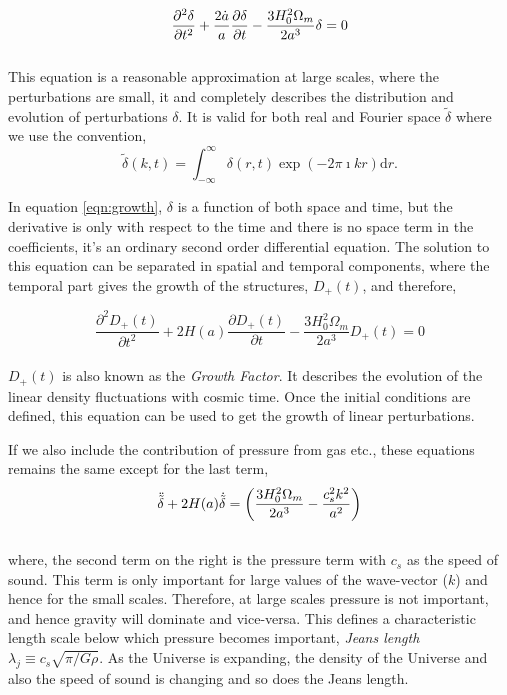 \begin{equation}
\centering
\dfrac{\partial^2 {\delta}}{\partial t^2} + \dfrac{2\dot{a}}{a} 
		\dfrac{\partial {\delta}}{\partial t}
		- \dfrac{3H_0^2 \Omega_m}{2a^3} {\delta} = 0
		\label{eqn:growth}
\end{equation}
\\
This equation is a reasonable approximation at large scales, where the perturbations
are small, it and completely describes the distribution and evolution of perturbations $\delta$. 
It is valid for both real and Fourier space $\tilde{\delta}$ where we use the convention,
\begin{equation}
	\tilde{\delta}(k,t) = \int_{-\infty}^{\infty} \delta(r,t) \exp(-2\pi \imath kr) \mathrm{d}r.
\end{equation}

In equation \ref{eqn:growth}, $\delta$ is a function of both space
and time, but the derivative is only with respect to the time and there is 
no space term in the coefficients, it's an ordinary second order differential equation.
The solution to this equation can be 
separated in spatial and temporal components, where the temporal part gives the 
growth of the structures, $D_+(t)$, and therefore,

\begin{equation}
	\dfrac{\partial^2 D_+(t)}{\partial t^2} + 2 H(a)
		\dfrac{\partial D_+(t)}{\partial t}
		- \dfrac{3H_0^2 \Omega_m}{2a^3} D_+(t) = 0
		\label{eqn:growthfactor}
\end{equation}
\\
$D_+(t)$ is also known as the {\it Growth Factor}. It describes the evolution of the
linear density fluctuations with cosmic time. Once the initial conditions
are defined, this equation can be used to get the growth of linear perturbations. 

If we also include the contribution of pressure from gas etc., these equations remains
the same except for the last term,
\begin{equation}
\centering
	\ddot{\tilde{\delta}} + 2H(a) \dot{\tilde{\delta}} = 
					\left( \dfrac{3H_0^2\Omega_m}{2a^3} - \dfrac{c_s^2k^2}{a^2}   \right)
\end{equation}
\\
where, the second term on the right is the pressure term with $c_s$ as the speed of sound. 
This term is only important
for large values of the wave-vector ($k$) and hence for the small scales. Therefore, at
large scales pressure is not important, and hence gravity will dominate and vice-versa. 
This defines a characteristic length scale below which pressure becomes important, 
{\it Jeans length} $\lambda_j \equiv c_s \sqrt{\pi/G\rho}$. As the Universe is 
expanding, the density of the Universe and also the speed of sound is changing 
and so does the Jeans length.

